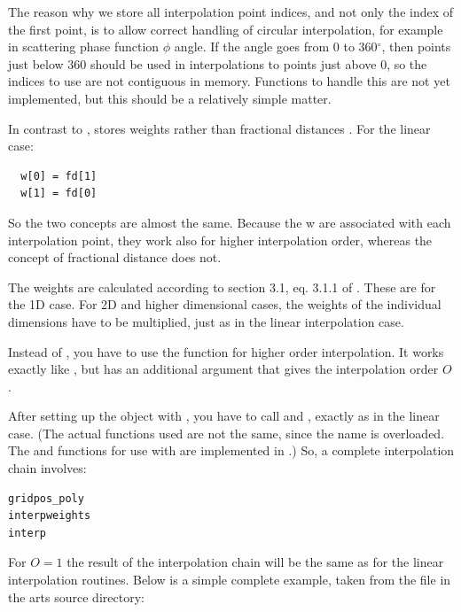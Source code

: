 The reason
why we store all interpolation point indices, and not only the index
of the first point, is to allow correct handling of circular
interpolation, for example in scattering phase function $\phi$
angle. If the angle goes from 0 to 360$^\circ$, then points just below
360 should be used in interpolations to points just above 0, so the
indices to use are not contiguous in memory. Functions to handle this
are not yet implemented, but this should be a relatively simple matter.

In contrast to ,  stores
weights  rather than fractional distances .
For the linear case:
\begin{verbatim}
  w[0] = fd[1]
  w[1] = fd[0]
\end{verbatim}

So the two concepts are almost the same.  Because the w are associated
with each interpolation point, they work also for higher interpolation
order, whereas the concept of fractional distance does not.

The weights are calculated according to 
section 3.1, eq. 3.1.1 of \citep{numerical_recipes_C:97}. These are
for the 1D case. For 2D and higher dimensional cases, the weights of
the individual dimensions have to be multiplied, just as in the linear
interpolation case.

Instead of , you have to use the function
 for higher order interpolation. It works
exactly like , but has an additional argument that
gives the interpolation order $O$. 

After setting up the  object with
, you have to call 
and , exactly as in the linear case. (The actual
functions used are not the same, since the name is overloaded. The
 and  functions for use
with  are implemented in
.) So, a complete interpolation chain
involves:

\begin{verbatim}
gridpos_poly
interpweights
interp
\end{verbatim}

For $O=1$ the result of the
interpolation chain will be the same as for the linear interpolation
routines. Below is a simple complete example, taken from
the file  in the arts source directory: 

